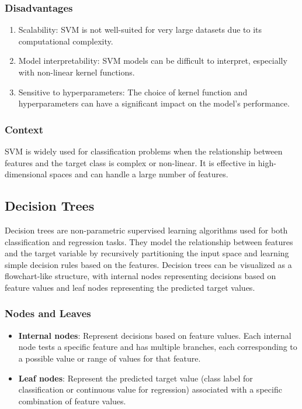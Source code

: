\documentclass[12pt]{article}
\begin{document}
\subsubsection{Disadvantages}
\begin{enumerate}
\item Scalability: SVM is not well-suited for very large datasets due to its computational complexity.
\item Model interpretability: SVM models can be difficult to interpret, especially with non-linear kernel functions.
\item Sensitive to hyperparameters: The choice of kernel function and hyperparameters can have a significant impact on the model's performance.
\end{enumerate}

\subsubsection{Context}

SVM is widely used for classification problems when the relationship between features and the target class is complex or non-linear. It is effective in high-dimensional spaces and can handle a large number of features.


\subsection{Decision Trees}

Decision trees are non-parametric supervised learning algorithms used for both classification and regression tasks. They model the relationship between features and the target variable by recursively partitioning the input space and learning simple decision rules based on the features. Decision trees can be visualized as a flowchart-like structure, with internal nodes representing decisions based on feature values and leaf nodes representing the predicted target values.

\subsubsection{Nodes and Leaves}

\begin{itemize}
\item \textbf{Internal nodes}: Represent decisions based on feature values. Each internal node tests a specific feature and has multiple branches, each corresponding to a possible value or range of values for that feature.
\item \textbf{Leaf nodes}: Represent the predicted target value (class label for classification or continuous value for regression) associated with a specific combination of feature values.
\end{itemize}
\end{document}
